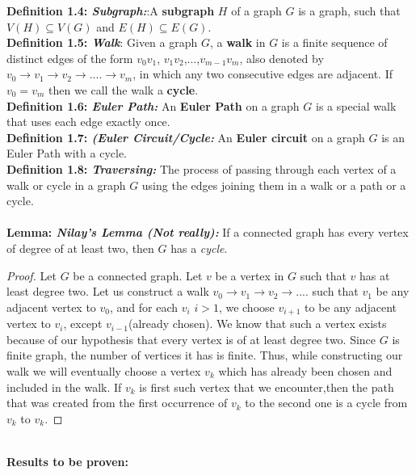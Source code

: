\documentclass[12pt, fullpage]{article}
\begin{document}
\textbf{Definition 1.4: \textit{Subgraph:}}:A \textbf{subgraph} $H$ of a graph $G$ is a graph, such that $V(H) \subseteq V(G)$ and $E(H) \subseteq E(G)$.\\

\textbf{Definition 1.5: \textit{Walk}}: Given a graph $G$, a \textbf{walk} in $G$ is a finite sequence of distinct edges of the form $v_0v_1$, $v_1v_2$,...,$v_{m-1}v_m$, also denoted by $v_0 \rightarrow v_1 \rightarrow v_2 \rightarrow ....\rightarrow v_m$, in which any two consecutive edges are adjacent.  If $v_0 = v_m$ then we call the walk a \textbf{cycle}.\\

\textbf{Definition 1.6: \textit{Euler Path: }}An \textbf{Euler Path} on a graph $G$ is a special walk that uses each edge exactly once.\\

\textbf{Definition 1.7: \textit{(Euler Circuit/Cycle: }}An \textbf{Euler circuit} on a graph $G$ is an Euler Path with a cycle.\\

\textbf{Definition 1.8: \textit{Traversing: }}The process of passing through each vertex of a  walk or cycle in a graph $G$ using the edges joining them in a walk or a path or a cycle.\\ \\

\textbf{Lemma: \textit{Nilay's Lemma (Not really):}} If a connected graph has every vertex of degree of at least two, then $G$ has a \textit{cycle}.
\begin{proof}
Let $G$ be a connected graph. Let $v$ be a vertex in $G$ such that $v$ has at least degree two. Let us construct a walk $v_0 \rightarrow v_1 \rightarrow v_2 \rightarrow ....$ such that $v_1$ be any adjacent vertex to $v_0$, and for each $v_i$ $i > 1$, we choose $v_{i+1}$ to be any adjacent vertex to $v_i$, except $v_{i-1}$(already chosen). We know that such a vertex exists because of our hypothesis that every vertex is of at least degree two. Since $G$ is finite graph, the number of vertices it has is finite. Thus, while constructing our walk we will eventually choose a vertex $v_k$ which has already been chosen and included in the walk. If $v_k$ is first such vertex that we encounter,then the path that was created from the first occurrence of $v_k$ to the second one is a cycle from $v_k$ to $v_k$.
\end{proof}



\textbf{\\Results to be proven: }
\end{document}
